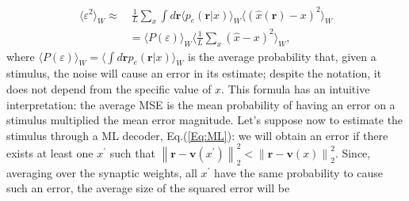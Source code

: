 \documentclass[a4paper]{article}%
\begin{document}
\begin{equation}%
\begin{split}
\langle\varepsilon^{2} \rangle_{W} \approx & \ \frac{1}{L}\sum_{x} \int
d\mathbf{r} \langle p_{e}(\mathbf{r}|x)\rangle_{W} \langle(\hat{x}(\mathbf{r})
-x )^{2}\rangle_{W}\\
& =\langle P(\varepsilon)\rangle_{W} \langle\frac{1}{L}\sum_{x} (\hat
{x}-x)^{2}\rangle_{W},\label{Eq:PE}%
\end{split}
\end{equation}
where $\langle P(\varepsilon)\rangle_{W} = \langle\int d\mathbf{r}
p_{e}(\mathbf{r}|x)\rangle_{W}$ is the average probability that, given a
stimulus, the noise will cause an error in its estimate; despite the notation,
it does not depend from the specific value of $x$. This formula has an
intuitive interpretation: the average MSE is the mean probability of having an
error on a stimulus multiplied the mean error magnitude. Let's suppose now to
estimate the stimulus through a ML decoder, Eq.(\ref{Eq:ML}): we will obtain
an error if there exists at least one $x^{\prime}$ such that $\left\|
\mathbf{r}-\mathbf{v}(x^{\prime}) \right\| _{2}^{2} < \left\|  \mathbf{r}%
-\mathbf{v}(x)\right\| _{2}^{2}$. Since, averaging over the synaptic weights,
all $x^{\prime}$ have the same probability to cause such an error, the average
size of the squared error will be%
\end{document}

